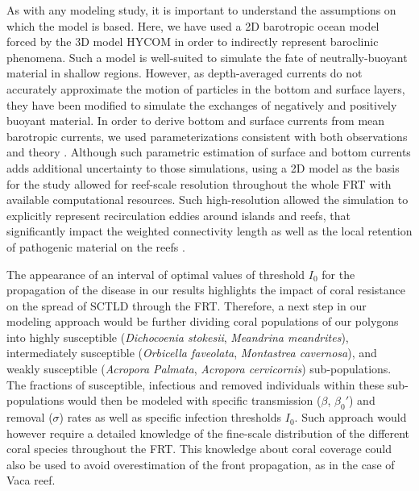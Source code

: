 As with any modeling study, it is important to understand the assumptions on which the model is based. Here, we have used a 2D barotropic ocean model forced by the 3D model HYCOM \citep{Chassignet2007} in order to indirectly represent baroclinic phenomena. Such a model is well-suited to simulate the fate of neutrally-buoyant material in shallow regions. However, as depth-averaged currents do not accurately approximate the motion of particles in the bottom and surface layers, they have been modified to simulate the exchanges of negatively and positively buoyant material. In order to derive bottom and surface currents from mean barotropic currents, we used parameterizations consistent with both observations and theory \citep{ardhuin2009observation,perlin2007organization, kundu1976ekman, smith2009influence}. Although such parametric estimation of surface and bottom currents adds additional uncertainty to those simulations, using a 2D model as the basis for the study allowed for reef-scale resolution throughout the whole FRT with available computational resources. Such high-resolution allowed the simulation to explicitly represent recirculation eddies around islands and reefs, that significantly impact the weighted connectivity length as well as the local retention of pathogenic material on the reefs \citep{frys20}.

The appearance of an interval of optimal values of threshold $I_0$ for the propagation of the disease in our results highlights the impact of coral resistance on the spread of SCTLD through the FRT. Therefore, a next step in our modeling approach would be further dividing coral populations of our polygons into highly susceptible (\eg \textit{Dichocoenia stokesii}, \textit{Meandrina meandrites}), intermediately susceptible (\eg \textit{Orbicella faveolata}, \textit{Montastrea cavernosa}), and weakly susceptible (\eg \textit{Acropora Palmata}, \textit{Acropora cervicornis}) sub-populations. The fractions of susceptible, infectious and removed individuals within these sub-populations would then be modeled with specific transmission ($\beta$, $\beta_0'$) and removal ($\sigma$) rates as well as specific infection thresholds $I_0$. Such approach would however require a detailed knowledge of the fine-scale distribution of the different coral species throughout the FRT. This knowledge about coral coverage could also be used to avoid overestimation of the front propagation, as in the case of Vaca reef.

